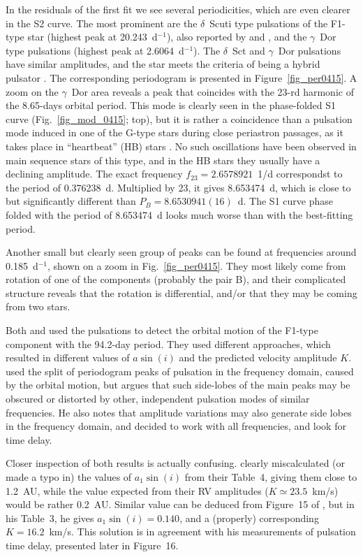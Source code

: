 \documentclass{aa}
\begin{document}
In the residuals of the first fit we see several periodicities, which are
even clearer in the S2 curve. The most prominent are the $\delta$~Scuti 
type pulsations of the F1-type star (highest peak at 20.243~d$^{-1}$), also 
reported by \citet{shi12} and \citet{bal14}, and the $\gamma$~Dor type 
pulsations (highest peak at 2.6064~d$^{-1}$). The $\delta$~Sct and $\gamma$~Dor 
pulsations have similar amplitudes, and the star meets the criteria of being a 
hybrid pulsator \citep{bra15}. The corresponding periodogram is presented 
in Figure~\ref{fig_per0415}. A zoom on the $\gamma$~Dor area reveals
a peak that coincides with the 23-rd harmonic of the 8.65-days orbital period.
This mode is clearly seen in the phase-folded S1 curve (Fig.~\ref{fig_mod_0415}; 
top), but it is rather a coincidence than a pulsation mode induced in one of the
G-type stars during close periastron passages, as it takes place in ``heartbeat'' 
(HB) stars \citep{bec14}. No such oscillations have been observed in main sequence
stars of this type, and in the HB stars they usually have a declining amplitude.
The exact frequency $f_{23}=2.6578921$~1/d correspondst to the period of 0.376238~d.
Multiplied by 23, it gives 8.653474~d, which is close to but significantly different 
than $P_B=8.6530941(16)$~d. The S1 curve phase folded with the period of 8.653474~d 
looks much worse than with the best-fitting period.

Another small but clearly seen group of peaks can be found at frequencies 
around 0.185~d$^{-1}$, shown on a zoom in Fig.~\ref{fig_per0415}. They most
likely come from rotation of one of the components (probably the pair B), 
and their complicated structure reveals that the rotation is differential,
and/or that they may be coming from two stars.

Both \citet{shi12} and \citet{bal14} used the pulsations to detect the orbital 
motion of the F1-type component with the 94.2-day period. They used different 
approaches, which resulted in different values of $a\sin(i)$ and the predicted
velocity amplitude $K$. \citet{shi12} used the split of periodogram peaks of 
pulsation in the frequency domain, caused by the orbital motion, but 
\citet{bal14} argues that such side-lobes of the main peaks may be obscured or 
distorted by other, independent pulsation modes of similar frequencies. He also 
notes that amplitude variations may also generate side lobes in the frequency 
domain, and decided to work with all frequencies, and look for time delay. 

Closer inspection of both results is actually confusing. \citet{shi12} clearly
miscalculated (or made a typo in) the values of $a_1\sin(i)$ from their Table~4, 
giving them close to 1.2~AU, while the value expected from their RV amplitudes 
($K\simeq23.5$~km/s) would be rather 0.2~AU. Similar value can be deduced from 
Figure~15 of \citet{bal14}, but in his Table~3, he gives $a_1\sin(i)=0.140$,
and a (properly) corresponding $K=16.2$~km/s. This solution is in agreement
with his measurements of pulsation time delay, presented later in Figure~16.
\end{document}
